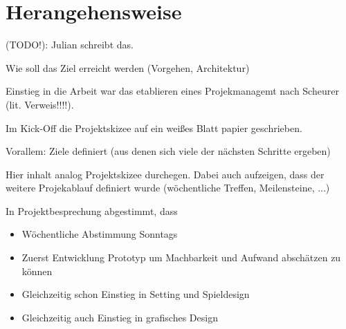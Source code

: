 
\section{Herangehensweise}

(TODO!): Julian schreibt das.

Wie soll das Ziel erreicht werden (Vorgehen, Architektur)


Einstieg in die Arbeit war das etablieren eines Projekmanagemt nach Scheurer (lit. Verweis!!!!).

Im Kick-Off die Projektskizee auf ein weißes Blatt papier geschrieben.

Vorallem: Ziele definiert (aus denen sich viele der nächsten Schritte ergeben)

Hier inhalt analog Projektskizee durchegen. Dabei auch aufzeigen, dass der weitere Projekablauf definiert wurde (wöchentliche Treffen, Meilensteine, ...)


In Projektbesprechung abgestimmt, dass 
\begin{itemize}
    \item Wöchentliche Abstimmung Sonntags
    \item Zuerst Entwicklung Prototyp um Machbarkeit und Aufwand abschätzen zu können 
    \item Gleichzeitig schon Einstieg in Setting und Spieldesign
    \item Gleichzeitig auch Einstieg in grafisches Design 
\end{itemize}




